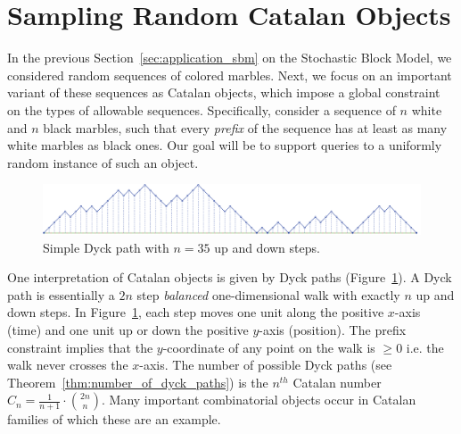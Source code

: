 \section{Sampling Random Catalan Objects}%
\label{sec:catalan_objects}

In the previous Section~\ref{sec:application_sbm} on the Stochastic Block Model, we considered random sequences of colored marbles.
Next, we focus on an important variant of these sequences as Catalan objects, which impose a global constraint on the types of allowable sequences.
Specifically, consider a sequence of $n$ white and $n$ black marbles,
such that every \emph{prefix} of the sequence has at least as many white marbles as black ones.
Our goal will be to support queries to a uniformly random instance of such an object.

\begin{figure}[htbp]
    \centering
    \includegraphics[width=\textwidth]{images/basic_dyck_path.pdf}
    \caption{Simple Dyck path with $n = 35$ up and down steps.}
    \label{fig:basic_dyck}
\end{figure}
One interpretation of Catalan objects is given by Dyck paths (Figure~\ref{fig:basic_dyck}).
A Dyck path is essentially a $2n$ step \emph{balanced} one-dimensional walk with exactly $n$ up and down steps.
In Figure~\ref{fig:basic_dyck}, each step moves one unit along the positive $x$-axis (time) and one unit up or down the positive $y$-axis (position).
The prefix constraint implies that the $y$-coordinate of any point on the walk is $\ge 0$ i.e. the walk never crosses the $x$-axis.
The number of possible Dyck paths (see Theorem~\ref{thm:number_of_dyck_paths}) is the $n^{th}$ Catalan number $C_n=\frac{1}{n+1}\cdot{2n\choose n}$.
Many important combinatorial objects occur in Catalan families of which these are an example.

